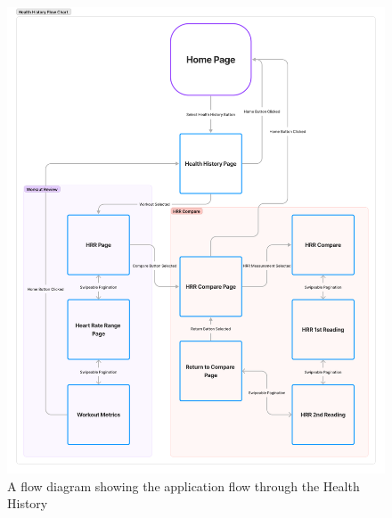 \documentclass{l4proj}
\begin{document}
\begin{figure}[h!]
    \centering
    \includegraphics[width=1\linewidth]{dissertation//dissImages/HealthHistoryFlow.pdf}
    \caption{A flow diagram showing the application flow through the Health History}
    \label{fig:healthhistoryflow}
\end{figure}
\end{document}

